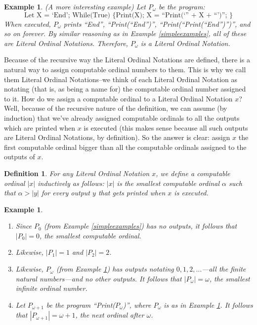 \documentclass[runningheads]{llncs}
\newtheorem{myexample}[mytheorem]{Example}
\newtheorem{mydefinition}[mytheorem]{Definition}
\begin{document}
\begin{myexample}
\label{omegaexample}
(A more interesting example)
    Let $P_\omega$ be the program:
    \[
        \mbox{Let X = `End'; While(True) \{ Print(X); X = ``Print(`'' + X + ``')''; \}}
    \]
    When executed, $P_\omega$ prints ``End'', ``Print(``End'')'',
    ``Print(``Print(``End'')'')'', and so on forever. By similar reasoning as
    in Example \ref{simpleexamples}, all of these are Literal Ordinal Notations.
    Therefore, $P_\omega$ is a Literal Ordinal Notation.
\end{myexample}

Because of the recursive way the Literal Ordinal Notations are defined, there is a
natural way to assign computable ordinal numbers to them. This is why we call them
Literal Ordinal Notations--we think of each Literal Ordinal Notation as notating
(that is, as being a name for) the computable ordinal number assigned to it.
How do we assign a computable ordinal to a Literal Ordinal Notation $x$? Well, because
of the recursive nature of the definition, we can assume (by induction) that we've
already assigned computable ordinals to all the outputs which are printed when $x$
is executed (this makes sense because all such outputs are Literal Ordinal Notations,
by definition). So the answer is clear: assign $x$ the first computable ordinal bigger
than all the computable ordinals assigned to the outputs of $x$.

\begin{mydefinition}
    For any Literal Ordinal Notation $x$, we define a computable ordinal $|x|$
    inductively as follows: $|x|$ is the smallest computable ordinal $\alpha$
    such that $\alpha>|y|$ for every output $y$ that gets printed when $x$ is
    executed.
\end{mydefinition}

\begin{myexample}
    \begin{enumerate}
        \item
        Since $P_0$ (from Example \ref{simpleexamples}) has no outputs,
        it follows that $|P_0|=0$, the smallest computable ordinal.
        \item
        Likewise, $|P_1|=1$ and $|P_2|=2$.
        \item
        Likewise, $P_\omega$ (from Example \ref{omegaexample}) has outputs
        notating $0, 1, 2, \ldots$---all the finite natural numbers---and no
        other outputs. It follows that $|P_\omega|=\omega$, the smallest
        infinite ordinal number.
        \item
        Let $P_{\omega+1}$ be the program ``Print($P_\omega$)'',
        where $P_\omega$ is as in Example \ref{omegaexample}.
        It follows that $|P_{\omega+1}|=\omega+1$, the next ordinal after
        $\omega$.
    \end{enumerate}
\end{myexample}
\end{document}
